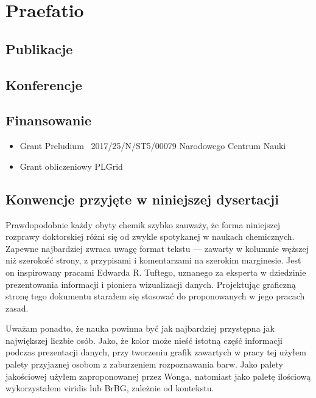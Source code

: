 \chapter{Praefatio}

\section{Publikacje}

\section{Konferencje}

\section{Finansowanie}

\begin{itemize}
  \item Grant Preludium \textnumero~2017/25/N/ST5/00079 Narodowego Centrum Nauki
  \item Grant obliczeniowy PL\=Grid
\end{itemize}


\section{Konwencje przyjęte w niniejszej dysertacji}

Prawdopodobnie każdy obyty chemik szybko zauważy, że forma niniejszej rozprawy doktorskiej różni się od zwykle spotykanej w naukach chemicznych.
Zapewne najbardziej zwraca uwagę format tekstu --- zawarty w kolumnie węższej niż szerokość strony, z przypisami i komentarzami na szerokim marginesie.
Jest on inspirowany pracami\autocite{Tufte2001,Tufte1990,Tufte1997,Tufte2006} Edwarda R. Tuftego,
uznanego za eksperta w dziedzinie prezentowania informacji i pioniera wizualizacji danych\autocite{Yaffa2011}.
Projektując graficzną stronę tego dokumentu starałem się stosować do proponowanych w jego pracach zasad.

Uważam ponadto, że nauka powinna być jak najbardziej przystępna jak największej liczbie osób.
Jako, że kolor może nieść istotną część informacji podczas prezentacji danych,
przy tworzeniu grafik zawartych w pracy tej użyłem palety przyjaznej osobom z zaburzeniem rozpoznawania barw.
Jako palety jakościowej użyłem zaproponowanej przez Wonga\autocite{wong11},
natomiast jako paletę ilościową wykorzystałem viridis\autocite{Smith2015} lub BrBG, zależnie od kontekstu.


